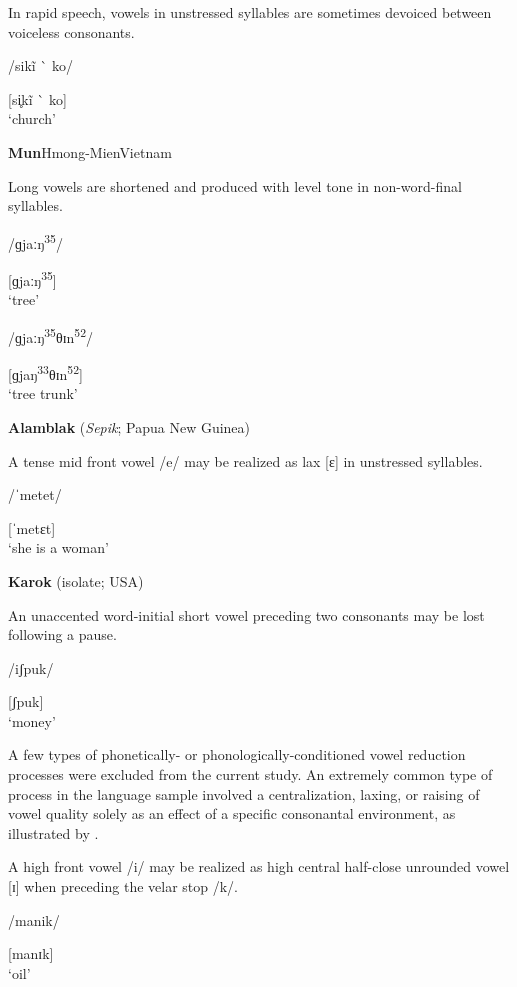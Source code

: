 In rapid speech, vowels in unstressed syllables are sometimes devoiced between voiceless consonants.

/sikĩ \`{} ko/

[si̥kĩ \`{} ko]\\
\glt ‘church’
\citep[18]{Holt1999}
\z

\ea\label{ex:6.7}
 \textbf{Mun}{Hmong-Mien}{Vietnam}

Long vowels are shortened and produced with level tone in non-word-final syllables. 

\ea  /ɡjaːŋ\textsuperscript{35}/

[ɡjaːŋ\textsuperscript{35}]\\
\glt ‘tree’

\ex  /ɡjaːŋ\textsuperscript{35}θɪn\textsuperscript{52}/

[ɡjaŋ\textsuperscript{33}θɪn\textsuperscript{52}]\\
\glt ‘tree trunk’
\citep[117]{Clark2008}
\z
\z

\ea\label{ex:6.8}
  \textbf{Alamblak} (\textit{Sepik}; Papua New Guinea)

A tense mid front vowel /e/ may be realized as lax [ɛ] in unstressed syllables.

/ˈmetet/

[ˈmetɛt]\\
\glt ‘she is a woman’
\citep[38]{Bruce1984}
\z

\ea\label{ex:6.9}
   \textbf{Karok} (isolate; USA)

An unaccented word-initial short vowel preceding two consonants may be lost following a pause. 

/iʃpuk/

[ʃpuk]\\
\glt ‘money’
\citep[53]{Bright1957}
\z

  A few types of phonetically- or phonologically-conditioned vowel reduction processes were excluded from the current study. An extremely common type of process in the language sample involved a centralization, laxing, or raising of vowel quality solely as an effect of a specific consonantal environment, as illustrated by .

\ea\label{ex:6.10}

A high front vowel /i/ may be realized as high central half-close unrounded vowel [ɪ] when preceding the velar stop /k/.

/manik/

[manɪk]\\
\glt ‘oil’
\citep[15]{Dol2007}
\z

